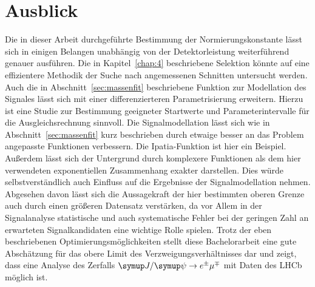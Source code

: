 \section{Ausblick}
%
Die in dieser Arbeit durchgeführte Bestimmung der Normierungskonstante lässt sich in einigen Belangen unabhängig von der Detektorleistung
weiterführend genauer ausführen. Die in Kapitel~\ref{chap:4} beschriebene Selektion könnte auf eine effizientere Methodik der Suche nach angemessenen Schnitten untersucht werden. Auch die in Abschnitt~\ref{sec:massenfit} beschriebene Funktion zur Modellation des Signales lässt sich mit einer differenzierteren Parametrisierung erweitern. Hierzu ist eine Studie zur Bestimmung geeigneter Startwerte und Parameterintervalle für die Ausgleichsrechnung sinnvoll. Die Signalmodellation lässt sich wie in Abschnitt~\ref{sec:massenfit} kurz beschrieben durch etwaige besser an das Problem angepasste Funktionen verbessern. Die Ipatia-Funktion ist hier ein Beispiel. Außerdem lässt sich der Untergrund
durch komplexere Funktionen als dem hier verwendeten exponentiellen Zusammenhang exakter darstellen. Dies würde selbstverständlich auch
Einfluss auf die Ergebnisse der Signalmodellation nehmen. Abgesehen davon lässt sich die Aussagekraft der hier bestimmten oberen Grenze auch durch einen größeren Datensatz verstärken, da vor Allem in der Signalanalyse statistische und auch systematische Fehler bei der geringen Zahl an erwarteten Signalkandidaten eine wichtige Rolle spielen.
Trotz der eben beschriebenen Optimierungsmöglichkeiten stellt diese Bachelorarbeit eine gute Abschätzung für das obere Limit des Verzweigungsverhältnisses dar und zeigt, dass eine Analyse des Zerfalls $\signal$ mit Daten des LHCb möglich ist.
